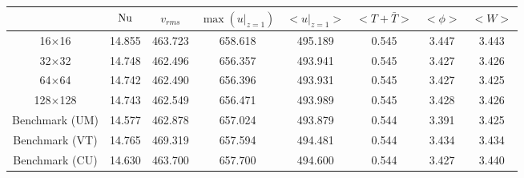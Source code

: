 \begin{tabular}{c|ccccccc}
    & $\mathrm{Nu}$ & $v_{rms}$ & $\max(u|_{z=1})$ & $<u|_{z=1}>$ & $<T + \bar{T}>$ & $<\phi>$ & $<W>$ \\
\hline
16$\times$16 & 14.855 & 463.723 & 658.618 & 495.189 & 0.545 & 3.447 & 3.443 \\
32$\times$32 & 14.748 & 462.496 & 656.357 & 493.941 & 0.545 & 3.427 & 3.426 \\
64$\times$64 & 14.742 & 462.490 & 656.396 & 493.931 & 0.545 & 3.427 & 3.425 \\
128$\times$128 & 14.743 & 462.549 & 656.471 & 493.989 & 0.545 & 3.428 & 3.426 \\
\hline
Benchmark (UM) & 14.577 & 462.878 & 657.024 & 493.879 & 0.544 & 3.391 & 3.425 \\
Benchmark (VT) & 14.765 & 469.319 & 657.594 & 494.481 & 0.544 & 3.434 & 3.434 \\
Benchmark (CU) & 14.630 & 463.700 & 657.700 & 494.600 & 0.544 & 3.427 & 3.440 \\
\end{tabular}
